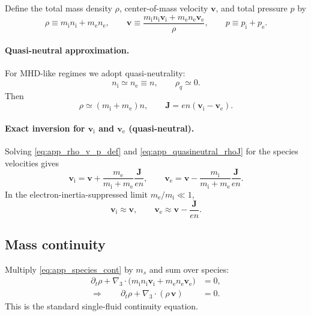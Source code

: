 \documentclass[11pt]{article}
\newcommand{\gradthree}{\nabla_3}
\newcommand{\ion}{\mathrm{i}}
\newcommand{\ele}{\mathrm{e}}
\begin{document}
Define the total mass density \(\rho\), center-of-mass velocity \(\mathbf{v}\), and
total pressure \(p\) by
\begin{equation}
\rho \equiv m_\ion n_\ion + m_\ele n_\ele,
\qquad
\mathbf{v} \equiv \frac{m_\ion n_\ion \mathbf{v}_\ion + m_\ele n_\ele \mathbf{v}_\ele}{\rho},
\qquad
p\equiv p_\ion + p_\ele.
\label{eq:app_rho_v_p_def}
\end{equation}

\paragraph{Quasi-neutral approximation.}
For MHD-like regimes we adopt quasi-neutrality:
\begin{equation}
n_\ion \simeq n_\ele \equiv n,
\qquad \rho_q \simeq 0.
\label{eq:app_quasineutral}
\end{equation}
Then
\begin{equation}
\rho \simeq (m_\ion+m_\ele)n,
\qquad
\mathbf{J} = en(\mathbf{v}_\ion - \mathbf{v}_\ele).
\label{eq:app_quasineutral_rhoJ}
\end{equation}

\paragraph{Exact inversion for \(\mathbf{v}_\ion\) and \(\mathbf{v}_\ele\) (quasi-neutral).}
Solving \eqref{eq:app_rho_v_p_def} and \eqref{eq:app_quasineutral_rhoJ} for the species
velocities gives
\begin{equation}
\mathbf{v}_\ion
=
\mathbf{v} + \frac{m_\ele}{m_\ion+m_\ele}\frac{\mathbf{J}}{en},
\qquad
\mathbf{v}_\ele
=
\mathbf{v} - \frac{m_\ion}{m_\ion+m_\ele}\frac{\mathbf{J}}{en}.
\label{eq:app_vi_ve_exact}
\end{equation}
In the electron-inertia-suppressed limit \(m_\ele/m_\ion\ll 1\),
\begin{equation}
\mathbf{v}_\ion \approx \mathbf{v},
\qquad
\mathbf{v}_\ele \approx \mathbf{v} - \frac{\mathbf{J}}{en}.
\label{eq:app_vi_ve_approx}
\end{equation}

\subsection{Mass continuity}
\label{app:mass_continuity}

Multiply \eqref{eq:app_species_cont} by \(m_s\) and sum over species:
\begin{align}
\partial_t\rho + \gradthree\cdot\!\Big(m_\ion n_\ion \mathbf{v}_\ion + m_\ele n_\ele \mathbf{v}_\ele\Big)
&=0,
\nonumber\\
\Rightarrow\qquad
\partial_t\rho + \gradthree\cdot(\rho\,\mathbf{v})
&=0.
\label{eq:app_mass_continuity}
\end{align}
This is the standard single-fluid continuity equation.
\end{document}
